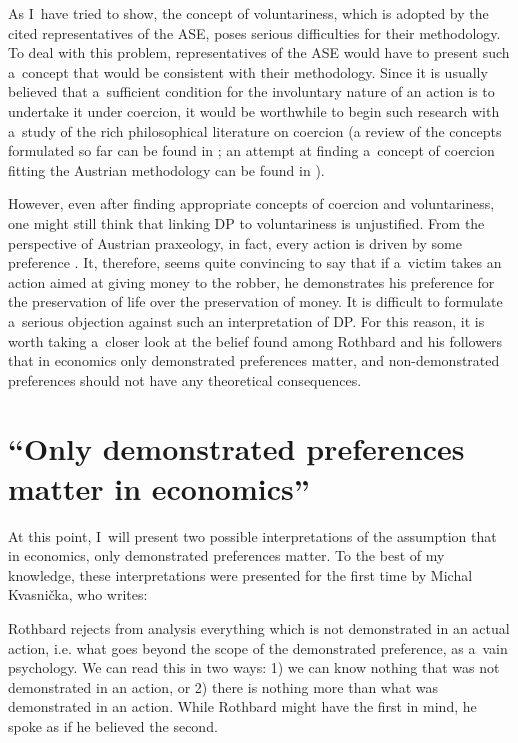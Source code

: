 As I~have tried to show, the concept of voluntariness, which is adopted by the cited representatives of the ASE, poses serious difficulties for their methodology. To deal with this problem, representatives of the ASE would have to present such a~concept that would be consistent with their methodology. Since it is usually believed that a~sufficient condition for the involuntary nature of an action is to undertake it under coercion, it would be worthwhile to begin such research with a~study of the rich philosophical literature on coercion (a review of the concepts formulated so far can be found in 
\parencite[][]{anderson_coercion_2021}; %
 an attempt at finding a~concept of coercion fitting the Austrian methodology can be found in 
\parencite[][]{megger_coercion_2023}%
).



However, even after finding appropriate concepts of coercion and voluntariness, one might still think that linking DP to voluntariness is unjustified. From the perspective of Austrian praxeology, in fact, every action is driven by some preference 
\parencite[][pp.13–14]{}. %
 It, therefore, seems quite convincing to say that if a~victim takes an action aimed at giving money to the robber, he demonstrates his preference for the preservation of life over the preservation of money. It is difficult to formulate a~serious objection against such an interpretation of DP. For this reason, it is worth taking a~closer look at the belief found among Rothbard and his followers that in economics only demonstrated preferences matter, and non-demonstrated preferences should not have any theoretical consequences.



\section{``Only demonstrated preferences matter in economics''}

At this point, I~will present two possible interpretations of the assumption that in economics, only demonstrated preferences matter. To the best of my knowledge, these interpretations were presented for the first time by Michal Kvasnička, who writes:



Rothbard rejects from analysis everything which is not demonstrated in an actual action, i.e. what goes beyond the scope of the demonstrated preference, as a~vain psychology. We can read this in two ways: 1) we can know nothing that was not demonstrated in an action, or 2) there is nothing more than what was demonstrated in an action. While Rothbard might have the first in mind, he spoke as if he believed the second. 
\parencite[][p.44]{kvasnicka_rothbards_2008}%




